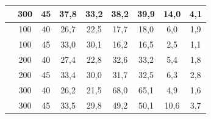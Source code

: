 \begin{table}[h]
{\begin{tabular}{ccccccccc}
        	                       &         300          &    45    &    37,8    &    33,2     &    38,2    &    39,9     &    14,0    &     4,1     \\ \midrule
        	\multirow{6}{*}{\DTAB} &         100          &    40    &    26,7    &    22,5     &    17,7    &    18,0     &    6,0     &     1,9     \\
        	                       &         100          &    45    &    33,0    &    30,1     &    16,2    &    16,5     &    2,5     &     1,1     \\
        	                       &         200          &    40    &    27,4    &    22,8     &    32,6    &    33,2     &    5,4     &     1,8     \\
        	                       &         200          &    45    &    33,4    &    30,0     &    31,7    &    32,5     &    6,3     &     2,8     \\
        	                       &         300          &    40    &    26,2    &    21,5     &    68,0    &    65,1     &    4,9     &     1,6     \\
        	                       &         300          &    45    &    33,5    &    29,8     &    49,2    &    50,1     &    10,6    &     3,7     \\ \bottomrule
        \end{tabular}}%
        {}
    \end{table}
  
  
  

